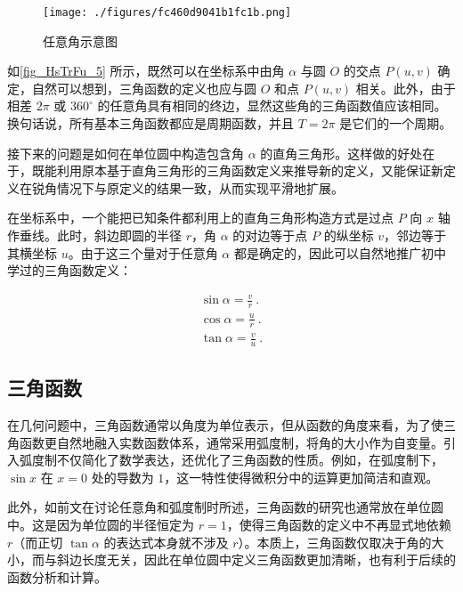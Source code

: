\begin{figure}[ht]
\centering
\texttt{[image: ./figures/fc460d9041b1fc1b.png]}
\caption{任意角示意图} \label{fig_HsTrFu_5}
\end{figure}

如\autoref{fig_HsTrFu_5} 所示，既然可以在坐标系中由角 $\alpha$ 与圆 $O$ 的交点 $P(u,v)$ 确定，自然可以想到，三角函数的定义也应与圆 $O$ 和点 $P(u,v)$ 相关。此外，由于相差 $2\pi$ 或 $360^\circ$ 的任意角具有相同的终边，显然这些角的三角函数值应该相同。换句话说，所有基本三角函数都应是周期函数，并且 $T=2\pi$ 是它们的一个周期。

接下来的问题是如何在单位圆中构造包含角 $\alpha$ 的直角三角形。这样做的好处在于，既能利用原本基于直角三角形的三角函数定义来推导新的定义，又能保证新定义在锐角情况下与原定义的结果一致，从而实现平滑地扩展。

在坐标系中，一个能把已知条件都利用上的直角三角形构造方式是过点 $P$ 向 $x$ 轴作垂线。此时，斜边即圆的半径 $r$，角 $\alpha$ 的对边等于点 $P$ 的纵坐标 $v$，邻边等于其横坐标 $u$。由于这三个量对于任意角 $\alpha$ 都是确定的，因此可以自然地推广初中学过的三角函数定义：

\begin{gather}
\sin\alpha = \frac{v}{r}~.\\
\cos\alpha = \frac{u}{r}~.\\
\tan\alpha = \frac{v}{u}~.
\end{gather}

\subsection{三角函数}

在几何问题中，三角函数通常以角度为单位表示，但从函数的角度来看，为了使三角函数更自然地融入实数函数体系，通常采用弧度制，将角的大小作为自变量。引入弧度制不仅简化了数学表达，还优化了三角函数的性质。例如，在弧度制下，$\sin x$ 在 $x=0$ 处的导数为 $1$，这一特性使得微积分中的运算更加简洁和直观。

此外，如前文在讨论任意角和弧度制时所述，三角函数的研究也通常放在单位圆中。这是因为单位圆的半径恒定为 $r=1$，使得三角函数的定义中不再显式地依赖 $r$（而正切 $\tan\alpha$ 的表达式本身就不涉及 $r$）。本质上，三角函数仅取决于角的大小，而与斜边长度无关，因此在单位圆中定义三角函数更加清晰，也有利于后续的函数分析和计算。

